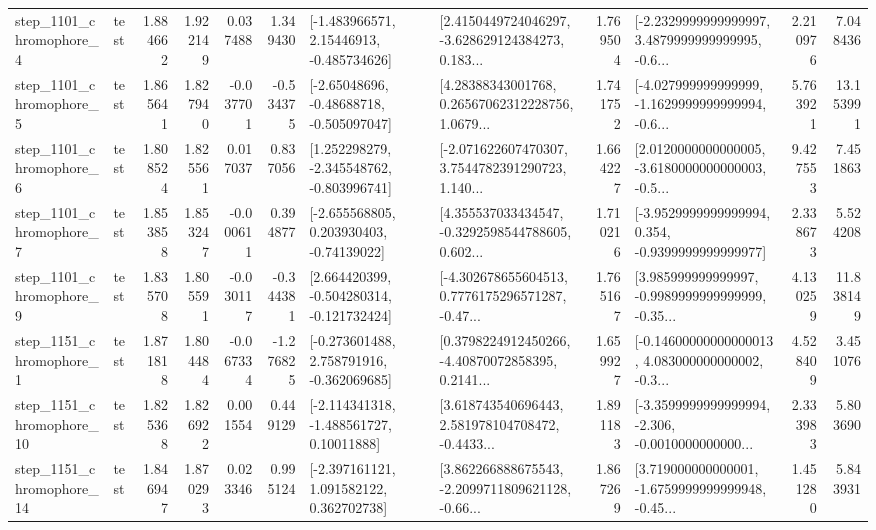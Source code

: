 \begin{tabular}{llrrrrllrlrr}
  step\_1101\_chromophore\_4 &      test &      1.884662 &    1.922149 &      0.037488 &  1.349430 &    [-1.483966571, 2.15446913, -0.485734626] &  [2.4150449724046297, -3.628629124384273, 0.183... &       1.769504 &  [-2.2329999999999997, 3.4879999999999995, -0.6... &            2.210976 &          7.048436 \\
  step\_1101\_chromophore\_5 &      test &      1.865641 &    1.827940 &     -0.037701 & -0.534375 &    [-2.65048696, -0.48688718, -0.505097047] &  [4.28388343001768, 0.26567062312228756, 1.0679... &       1.741752 &  [-4.027999999999999, -1.1629999999999994, -0.6... &            5.763921 &         13.153991 \\
  step\_1101\_chromophore\_6 &      test &      1.808524 &    1.825561 &      0.017037 &  0.837056 &   [1.252298279, -2.345548762, -0.803996741] &  [-2.071622607470307, 3.7544782391290723, 1.140... &       1.664227 &  [2.0120000000000005, -3.6180000000000003, -0.5... &            9.427553 &          7.451863 \\
  step\_1101\_chromophore\_7 &      test &      1.853858 &    1.853247 &     -0.000611 &  0.394877 &    [-2.655568805, 0.203930403, -0.74139022] &  [4.355537033434547, -0.3292598544788605, 0.602... &       1.710216 &  [-3.9529999999999994, 0.354, -0.9399999999999977] &            2.338673 &          5.524208 \\
  step\_1101\_chromophore\_9 &      test &      1.835708 &    1.805591 &     -0.030117 & -0.344381 &   [2.664420399, -0.504280314, -0.121732424] &  [-4.302678655604513, 0.7776175296571287, -0.47... &       1.765167 &  [3.985999999999997, -0.9989999999999999, -0.35... &            4.130259 &         11.838149 \\
  step\_1151\_chromophore\_1 &      test &      1.871818 &    1.804484 &     -0.067334 & -1.276825 &   [-0.273601488, 2.758791916, -0.362069685] &  [0.3798224912450266, -4.40870072858395, 0.2141... &       1.659927 &  [-0.14600000000000013, 4.083000000000002, -0.3... &            4.528409 &          3.451076 \\
 step\_1151\_chromophore\_10 &      test &      1.825368 &    1.826922 &      0.001554 &  0.449129 &    [-2.114341318, -1.488561727, 0.10011888] &  [3.618743540696443, 2.581978104708472, -0.4433... &       1.891183 &  [-3.3599999999999994, -2.306, -0.0010000000000... &            2.333983 &          5.803690 \\
 step\_1151\_chromophore\_14 &      test &      1.846947 &    1.870293 &      0.023346 &  0.995124 &    [-2.397161121, 1.091582122, 0.362702738] &  [3.862266888675543, -2.2099711809621128, -0.66... &       1.867269 &  [3.719000000000001, -1.6759999999999948, -0.45... &            1.451280 &          5.843931 \\

\end{tabular}

